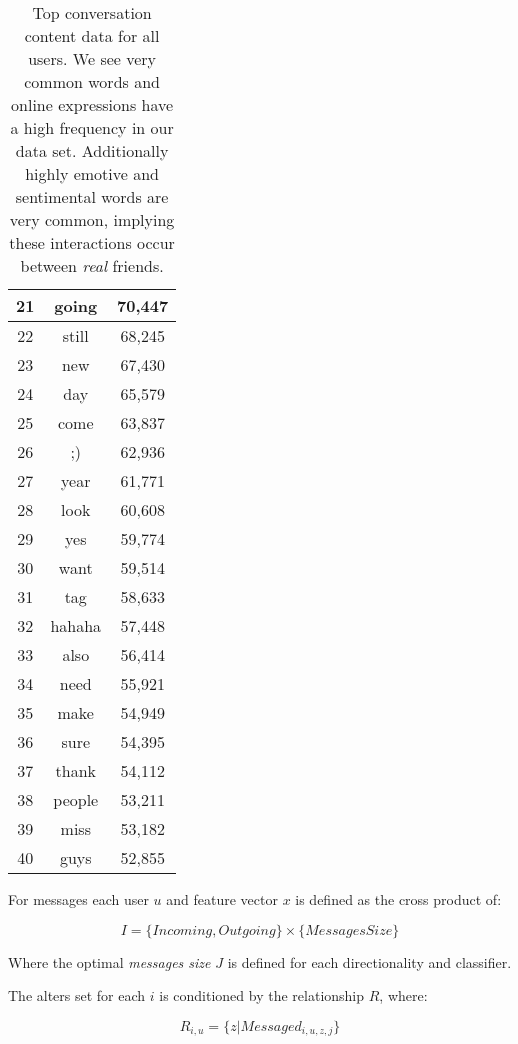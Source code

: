 \begin{table}[!htbp]
\begin{minipage}[b]{.5\textwidth}
\centering
\begin{tabular}{|c|c|c|} %
		\hline
		21 & going & 70,447 \\ \hline
		22 & still & 68,245 \\ \hline
		23 & new & 67,430 \\ \hline
		24 & day & 65,579 \\ \hline
		25 & come & 63,837 \\ \hline
		26 & ;) & 62,936 \\ \hline
		27 & year & 61,771 \\ \hline
		28 & look & 60,608 \\ \hline
		29 & yes & 59,774 \\ \hline
		30 & want & 59,514 \\ \hline
		31 & tag & 58,633 \\ \hline
		32 & hahaha & 57,448 \\ \hline
		33 & also & 56,414 \\ \hline
		34 & need & 55,921 \\ \hline
		35 & make & 54,949 \\ \hline
		36 & sure & 54,395 \\ \hline
		37 & thank & 54,112 \\ \hline
		38 & people & 53,211 \\ \hline
		39 & miss & 53,182 \\ \hline
		40 & guys & 52,855 \\ \hline
	\end{tabular}
\end{minipage}
	\caption{Top conversation content data for all users. We see very common words and online expressions have a high frequency in
	our data set. Additionally highly emotive and sentimental words are very common, implying these interactions occur between \emph{real} friends.}
	\label{tab:revpol}
\end{table}

For messages each user $u$ and feature vector $x$ is defined as the cross product of:

\[ I = \{Incoming, Outgoing\} \times \{Messages Size\} \]

Where the optimal \emph{messages size} $J$ is defined for each directionality and classifier.

The alters set for each $i$ is conditioned by the relationship $R$, where:

\[ R_{i,u} = \{z | Messaged_{i,u,z,j}\} \]

